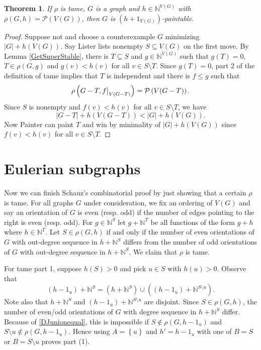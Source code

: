 \documentclass[12pt]{article}
\theoremstyle{plain}
\newtheorem{thm}{Theorem}[section]
\theoremstyle{definition}
\theoremstyle{remark}
\newcommand{\IN}{\mathbb{N}}
\newcommand{\set}[1]{\left\{ #1 \right\}}
\newcommand{\card}[1]{\left|#1\right|}
\newcommand{\parens}[1]{\left( #1 \right)}
\newcommand\restr[2]{{%
  \left.\kern-\nulldelimiterspace %
  #1 %
  \vphantom{\big|} %
  \right|_{#2} %
  }}
\newcommand{\powset}[1]{\mathcal{P}\parens{#1}}
\begin{document}
\begin{thm}\label{TameRhoWins}
	If $\rho$ is tame, $G$ is a graph and $h \in \IN^{V(G)}$ with $\rho(G, h) = \powset{V(G)}$, then $G$ is $(h + 1_{V(G)})$-paintable.
\end{thm}
\begin{proof}
	Suppose not and choose a counterexample $G$ minimizing $|G| + h(V(G))$.  Say Lister lists nonempty $S \subseteq V(G)$ on the first move.
	By Lemma \ref{GetSuperStable}, there is $T \subseteq S$ and $g \in \IN^{V(G)}$ such that $g(T) = 0$, $T \in \rho(G, g)$ and $g(v) < h(v)$ for all $v \in S\setminus T$.
	Since $g(T) = 0$, part 2 of the definition of tame implies that $T$ is independent and there is $f \le g$ such that
	\[\rho\parens{G - T, \restr{f}{V(G-T)}} = \powset{V(G-T)}.\]
	Since $S$ is nonempty and $f(v) < h(v)$ for all $v \in S\setminus T$, we have 
	\[\card{G-T} + h(V(G-T)) < \card{G} + h(V(G)).\]
	Now Painter can paint $T$ and win by minimality of $|G| + h(V(G))$ since $f(v) < h(v)$ for all $v \in S\setminus T$.
\end{proof}


\section{Eulerian subgraphs}
Now we can finish Schauz's combinatorial proof by just showing that a certain $\rho$ is tame.  
For all graphs $G$ under consideration, we fix an ordering of $V(G)$ and say an orientation of $G$ is even (resp. odd) if the number of edges pointing to the right is even (resp. odd).  
For $g \in \IN^S$ let $g + \IN^T$ be all functions of the form $g + h$ where $h \in \IN^T$. Let $S \in \rho(G, h)$ if and only if the number of even orientations of $G$ 
with out-degree sequence in $h + \IN^S$ differs from the number of odd orientations of $G$ with out-degree sequence in $h + \IN^S$.  We claim that $\rho$ is tame.  

For tame part 1, suppose $h(S) > 0$ and pick $u \in S$ with $h(u) > 0$.  Observe that 
\begin{equation}\label{DJunionequal}
(h - 1_u) + \IN^S = (h + \IN^S) \cup ((h - 1_u) + \IN^{S \setminus u}).
\end{equation}
Note also that $h + \IN^S$ and $(h - 1_u) + \IN^{S \setminus u}$ are disjoint.  Since $S \in \rho(G, h)$, the number of even/odd orientations of $G$ with degree sequence in $h + \IN^S$ differ.  
Because of \eqref{DJunionequal}, this is impossible if $S \not \in \rho(G, h - 1_u)$ and $S \setminus u \not \in \rho(G, h - 1_u)$. 
Hence using $A = \set{u}$ and $h' = h - 1_u$ with one of $B=S$ or $B = S \setminus u$ proves part (1).
\end{document}
